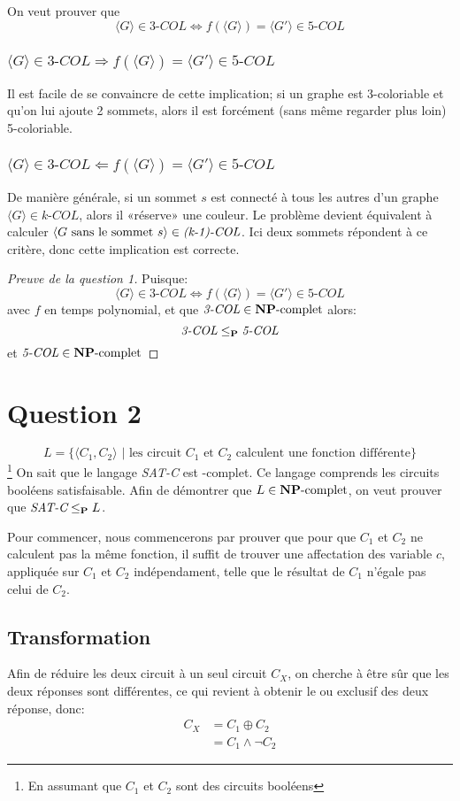 \documentclass{article}
\newcommand\NP{{\normalfont{\textbf{NP}}}}
\newcommand\PP{{\normalfont{\textbf{P}}}}
\newcommand\col[1]{\textit{#1-COL}}
\newcommand\SC{\textit{SAT-C}}
\newcommand\bk[1]{\langle #1 \rangle}
\begin{document}
On veut prouver que $$\bk{G} \in \col{3} \Leftrightarrow f(\bk{G}) = \bk{G'} \in \col{5}$$

\subsubsection{\normalfont $\bk{G} \in \col{3} \Rightarrow f(\bk{G}) = \bk{G'} \in \col{5}$}
Il est facile de se convaincre de cette implication; si un graphe est 3-coloriable et qu'on lui ajoute 2 sommets, alors il est forcément (sans même regarder plus loin) 5-coloriable.

\subsubsection{\normalfont $\bk{G} \in \col{3} \Leftarrow f(\bk{G}) = \bk{G'} \in \col{5}$}
De manière générale, si un sommet $s$ est connecté à tous les autres d'un graphe $\bk{G} \in \col{k}$, alors il «réserve» une couleur. Le problème devient équivalent à calculer $\bk{G \text{ sans le sommet } s} \in \col{\text{(k-1)}}$. Ici deux sommets répondent à ce critère, donc cette implication est correcte.

\begin{proof}[Preuve de la question 1]
  Puisque:
  $$\bk{G} \in \col{3} \Leftrightarrow f(\bk{G}) = \bk{G'} \in \col{5}$$
  avec $f$ en temps polynomial, et que $\col{3} \in \text{\NP-complet}$
  alors:
  $$\col{3} \leq_\PP \col{5}$$
  et $\col{5} \in \text{\NP-complet}$
\end{proof}

\pagebreak

\section{Question 2}
$$L = \{\bk{C_1, C_2} \text{  | les circuit $C_1$ et $C_2$ calculent une fonction différente} \}$$
\footnote{En assumant que $C_1$ et $C_2$ sont des circuits booléens} On sait que le langage \SC{} est \NP-complet. Ce langage comprends les circuits booléens satisfaisable. Afin de démontrer que $L \in \text{\NP-complet}$, on veut prouver que $\SC \leq_\PP L$.

Pour commencer, nous commencerons par prouver que pour que $C_1$ et $C_2$ ne calculent pas la même fonction, il suffit de trouver une affectation des variable $c$, appliquée sur $C_1$ et $C_2$ indépendament, telle que le résultat de $C_1$ n'égale pas celui de $C_2$.

\subsection{Transformation}
Afin de réduire les deux circuit à un seul circuit $C_X$, on cherche à être sûr que les deux réponses sont différentes, ce qui revient à obtenir le ou exclusif des deux réponse, donc:
\begin{align*}
  C_X &= C_1 \oplus C_2\\
  &= C_1 \wedge \neg C_2
\end{align*}
\end{document}
